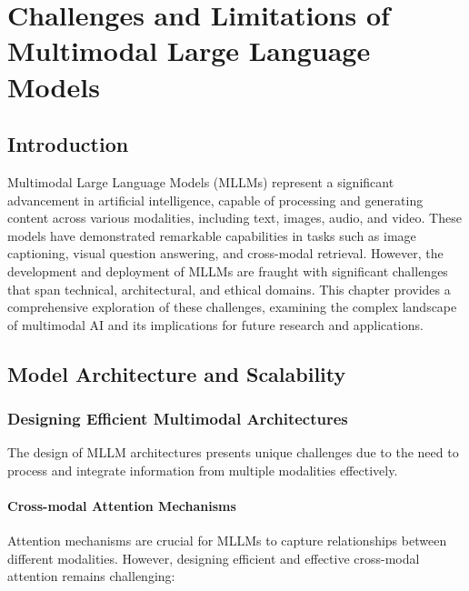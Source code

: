 \chapter{Challenges and Limitations of Multimodal Large Language Models}




\section{Introduction}
Multimodal Large Language Models (MLLMs) represent a significant advancement in artificial intelligence, capable of processing and generating content across various modalities, including text, images, audio, and video. These models have demonstrated remarkable capabilities in tasks such as image captioning, visual question answering, and cross-modal retrieval. However, the development and deployment of MLLMs are fraught with significant challenges that span technical, architectural, and ethical domains. This chapter provides a comprehensive exploration of these challenges, examining the complex landscape of multimodal AI and its implications for future research and applications.

\section{Model Architecture and Scalability}

\subsection{Designing Efficient Multimodal Architectures}
The design of MLLM architectures presents unique challenges due to the need to process and integrate information from multiple modalities effectively.

\subsubsection{Cross-modal Attention Mechanisms}
Attention mechanisms are crucial for MLLMs to capture relationships between different modalities. However, designing efficient and effective cross-modal attention remains challenging:

